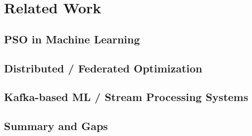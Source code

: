 \chapter{Related Work}

\section{PSO in Machine Learning}

\section{Distributed / Federated Optimization}

\section{Kafka-based ML / Stream Processing Systems}

\section{Summary and Gaps}
